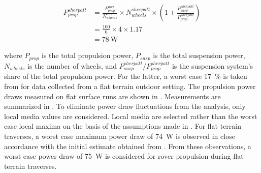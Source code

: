 \begin{align}
  \label{eq:InitialPropulsionPowerEstimate}
  P_{prop}^{sherpatt} &= \frac{P_{prop}^{mer}}{N_{wheels}^{mer}} \times N_{wheels}^{sherpatt} \times \left(1 +\frac{P_{susp}^{sherpatt}}{P_{prop}^{sherpatt}}\right) \\
           &= \frac{100}{6} \times 4 \times 1.17\\
           &= \SI{78}{\watt}
\end{align}


where $P_{prop}$ is the total propulsion power, $P_{susp}$ is the total suspension power, $N_{wheels}$ is the number of wheels, and $P_{susp}^{sherpatt} / P_{prop}^{sherpatt}$ is the suspension system's share of the total propulsion power. For the latter, a worst case \SI{17}{\percent} is taken from  for data collected from a flat terrain outdoor setting. The propulsion power draws measured on flat surface runs are shown in . Measurements are summarized in . To eliminate power draw fluctuations from the analysis, only local media values are considered. Local media are selected rather than the worst case local maxima on the basis of the assumptions made in . For flat terrain traverses, a worst case maximum power draw of \SI{74}{\watt} is observed in close accordance with the initial estimate obtained from . From these observations, a worst case power draw of \SI{75}{\watt} is considered for rover propulsion during flat terrain traverses.




